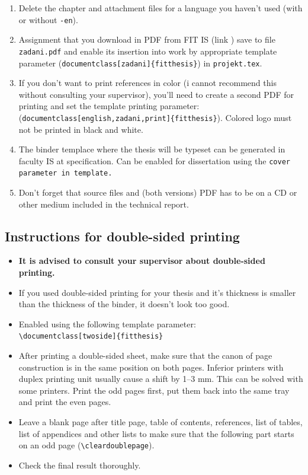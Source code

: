\begin{enumerate}
  \item Delete the chapter and attachment files for a language you haven't used (with or without \texttt{-en}).
  \item Assignment that you download in PDF from FIT IS (link ) save to file \texttt{zadani.pdf} and enable its insertion into work by appropriate template parameter (\verb|document|\verb|class[zadani]{fitthesis}|) in \texttt{projekt.tex}.
  \item If you don't want to print references in color (i cannot recommend this without consulting your supervisor), you'll need to create a second PDF for printing and set the template printing parameter:\\ (\verb|document|\verb|class[english,zadani,print]{fitthesis}|). Colored logo must not be printed in black and white.
  \item The binder templace where the thesis will be typeset can be generated in faculty IS at specification. Can be enabled for dissertation using the \tt cover \rm parameter in template.
  \item Don't forget that source files and (both versions) PDF has to be on a CD or other medium included in the technical report.
\end{enumerate}

\subsection*{Instructions for double-sided printing}
\begin{itemize}
\item \textbf{It is advised to consult your supervisor about double-sided printing.}
\item If you used double-sided printing for your thesis and it's thickness is smaller than the thickness of the binder, it doesn't look too good.
\item Enabled using the following template parameter:\\ \verb|\document|\verb|class[twoside]{fitthesis}|
\item After printing a double-sided sheet, make sure that the canon of page construction is in the same position on both pages. Inferior printers with duplex printing unit usually cause a shift by 1--3 mm. This can be solved with some printers. Print the odd pages first, put them back into the same tray and print the even pages.
\item Leave a blank page after title page, table of contents, references, list of tables, list of appendices and other lists to make sure that the following part starts on an odd page (\texttt{\textbackslash cleardoublepage}).
\item Check the final result thoroughly.
\end{itemize}

